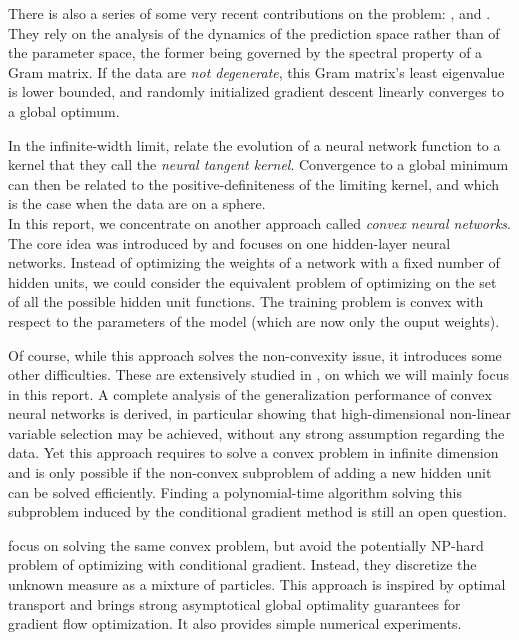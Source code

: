 \documentclass[a4paper, 11pt]{scrartcl}
\begin{document}
There is also a series of some very recent contributions on the problem: \cite{du2018agradient}, \cite{du2018bgradient} and \cite{zou2018stochastic}. They rely on the analysis of the dynamics of the prediction space rather than of the parameter space, the former being governed by the spectral property of a Gram matrix. If the data are \textit{not degenerate}, this Gram matrix’s least eigenvalue is lower bounded, and randomly initialized gradient descent linearly converges to a global optimum.

In the infinite-width limit, \cite{jacot2018neural} relate the evolution of a neural network function to a kernel that they call the \textit{neural tangent kernel}. Convergence to a global minimum can then be related to the positive-definiteness of the limiting kernel, and which is the case when the data are on a sphere.\\

In this report, we concentrate on another approach called \textit{convex neural networks}. The core idea was introduced by \cite{bengio2006convex} and focuses on one hidden-layer neural networks. Instead of optimizing the weights of a network with a fixed number of hidden units, we could consider the equivalent problem of optimizing on the set of all the possible hidden unit functions. The training problem is convex with respect to the parameters of the model (which are now only the ouput weights).

Of course, while this approach solves the non-convexity issue, it introduces some other difficulties. These are extensively studied in \cite{bach2017breaking}, on which we will mainly focus in this report. A complete analysis of the generalization performance of convex neural networks is derived, in particular showing that high-dimensional non-linear variable selection may be achieved, without any strong assumption regarding the data. Yet this approach requires to solve a convex problem in infinite dimension and is only possible if the non-convex subproblem of adding a new hidden unit can be solved efficiently. Finding a polynomial-time algorithm solving this subproblem induced by the conditional gradient method is still an open question.

\cite{chizat2018global} focus on solving the same convex problem, but avoid the potentially NP-hard problem of optimizing with conditional gradient. Instead, they discretize the unknown measure as a mixture of particles. This approach is inspired by optimal transport and brings strong asymptotical global optimality guarantees for gradient flow optimization. It also provides simple numerical experiments.\\
\end{document}
